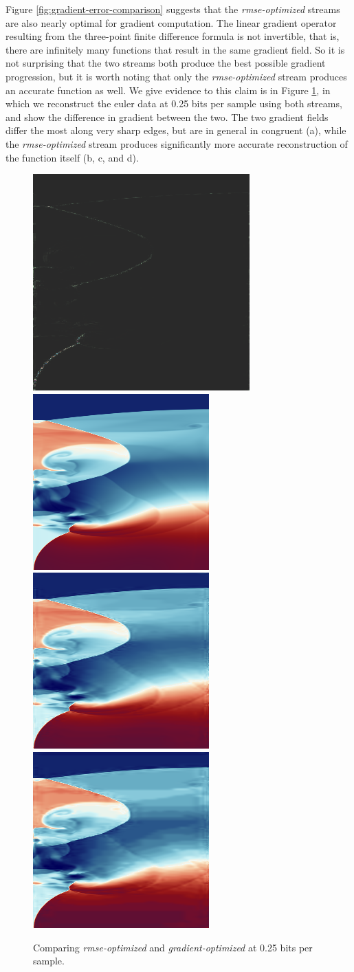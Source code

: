 Figure \ref{fig:gradient-error-comparison} suggests that the \emph{rmse-optimized} streams are also
nearly optimal for gradient computation. The linear gradient operator resulting from the three-point
finite difference formula is not invertible, that is, there are infinitely many functions that
result in the same gradient field. So it is not surprising that the two streams both produce the
best possible gradient progression, but it is worth noting that only the \emph{rmse-optimized}
stream produces an accurate function as well. We give evidence to this claim is in Figure
\ref{fig:gradient-comparison}, in which we reconstruct the euler data at 0.25 bits per sample using
both streams, and show the difference in gradient between the two. The two gradient fields differ
the most along very sharp edges, but are in general in congruent (a), while the
\emph{rmse-optimized} stream produces significantly more accurate reconstruction of the function
itself (b, c, and d).

\begin{figure}
	\centering
	{\includegraphics[width=0.24\linewidth]{img/gradient-laplacian/grad-diff.png}}
	{\includegraphics[width=0.24\linewidth]{img/gradient-laplacian/euler-original.png}}
	{\includegraphics[width=0.24\linewidth]{img/gradient-laplacian/euler-rmse.png}}
	{\includegraphics[width=0.24\linewidth]{img/gradient-laplacian/euler-gradient.png}}
	\caption{Comparing \emph{rmse-optimized} and \emph{gradient-optimized} at 0.25 bits per sample. }
	\label{fig:gradient-comparison}
\end{figure}

